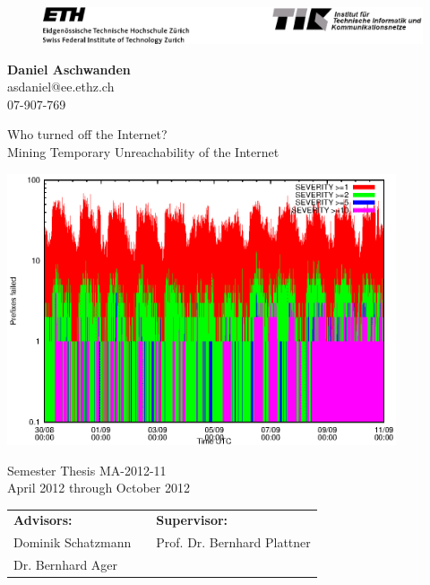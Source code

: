 

\begin{titlepage}
	\begin{center}
		\begin{figure}
			[!t] 
			\includegraphics[width=
			\textwidth]{images/TIKETHhdr.eps} 
		\end{figure}
	\end{center}
	
	\vspace{2mm} \textbf{Daniel Aschwanden}\\
	asdaniel@ee.ethz.ch\\
	07-907-769 \vspace{2mm}
	
	{\Huge 
	\begin{flushleft}
		Who turned off the Internet?\\
		\Large Mining Temporary Unreachability of the Internet 
	\end{flushleft}
	} \vspace{3mm} \centering 
	\includegraphics[height=8cm]{images/prefix_failed_ipv4.eps}
	
	\vspace{3mm}
	
	Semester Thesis MA-2012-11\\
	April 2012 through October 2012\\
	
	\vspace{5mm}
	\begin{tabular}
		{l p{} l} \textbf{Advisors:} && \textbf{Supervisor:} \\
		Dominik Schatzmann && Prof. Dr. Bernhard Plattner\\
		Dr. Bernhard Ager && \\
	\end{tabular}
	

\end{titlepage}
